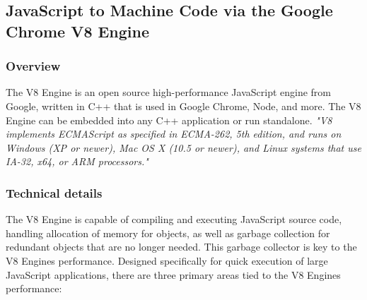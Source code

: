 \subsection{JavaScript to Machine Code via the Google Chrome V8 Engine}
	\subsubsection{Overview}
    	The V8 Engine is an open source high-performance JavaScript engine from Google, written in C++ that is used in Google Chrome, Node, and more. The V8 Engine can be embedded into any C++ application or run standalone\cite{googleV8}. \emph{"V8 implements ECMAScript as specified in ECMA-262, 5th edition, and runs on Windows (XP or newer), Mac OS X (10.5 or newer), and Linux systems that use IA-32, x64, or ARM processors."}\cite{googleV8} 
	\subsubsection{Technical details}
    The V8 Engine is capable of compiling and executing JavaScript source code, handling allocation of memory for objects, as well as garbage collection for redundant objects that are no longer needed. This garbage collector is key to the V8 Engines performance. Designed specifically for quick execution of large JavaScript applications, there are three primary areas tied to the V8 Engines performance: 
